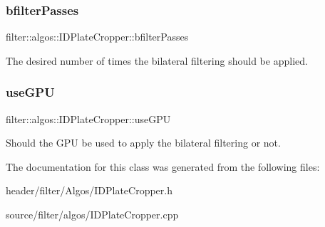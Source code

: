 \subsubsection{\texorpdfstring{bfilter\+Passes}{bfilterPasses}}
{\footnotesize\ttfamily filter\+::algos\+::\+I\+D\+Plate\+Cropper\+::bfilter\+Passes}

The desired number of times the bilateral filtering should be applied. \mbox{\label{classfilter_1_1algos_1_1_i_d_plate_cropper_a4d72b1833fc13bc45ec68bb523a92195}} 
\subsubsection{\texorpdfstring{use\+G\+PU}{useGPU}}
{\footnotesize\ttfamily filter\+::algos\+::\+I\+D\+Plate\+Cropper\+::use\+G\+PU}

Should the G\+PU be used to apply the bilateral filtering or not. 

The documentation for this class was generated from the following files\+:\begin{DoxyCompactItemize}
\item 
header/filter/\+Algos/I\+D\+Plate\+Cropper.\+h\item 
source/filter/algos/I\+D\+Plate\+Cropper.\+cpp\end{DoxyCompactItemize}
